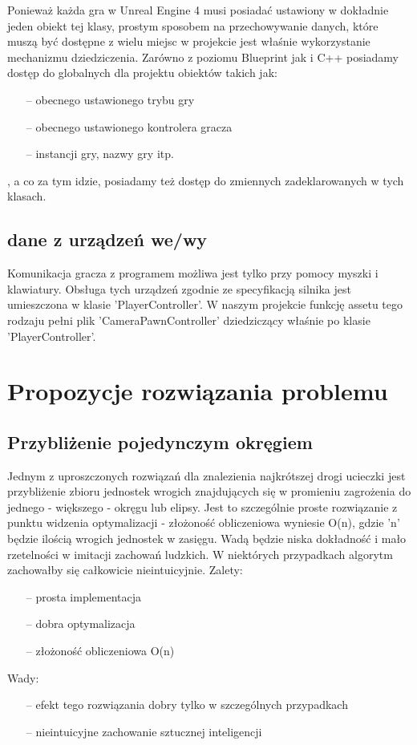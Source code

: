 \documentclass[12pt]{report}
\begin{document}
Ponieważ każda gra w Unreal Engine 4 musi posiadać ustawiony w dokładnie jeden obiekt tej klasy, prostym sposobem na przechowywanie danych, które muszą być dostępne z wielu miejsc w projekcie jest właśnie wykorzystanie mechanizmu dziedziczenia. Zarówno z poziomu Blueprint jak i C++ posiadamy dostęp do globalnych dla projektu obiektów takich jak: 
\begin{itemize}
\item[--] obecnego ustawionego trybu gry
\item[--] obecnego ustawionego kontrolera gracza
\item[--] instancji gry, nazwy gry itp.
\end{itemize}
, a co za tym idzie, posiadamy też dostęp do zmiennych zadeklarowanych w tych klasach.
\subsection{dane z urządzeń we/wy}
Komunikacja gracza z programem możliwa jest tylko przy pomocy myszki i klawiatury. Obsługa tych urządzeń zgodnie ze specyfikacją silnika jest umieszczona w klasie 'PlayerController'. W naszym projekcie funkcję assetu tego rodzaju pełni plik 'CameraPawnController' dziedziczący właśnie po klasie 'PlayerController'.
\section{Propozycje rozwiązania problemu}
\subsection{Przybliżenie pojedynczym okręgiem}
Jednym z uproszczonych rozwiązań dla znalezienia najkrótszej drogi ucieczki jest przybliżenie zbioru jednostek wrogich znajdujących się w promieniu zagrożenia do jednego - większego - okręgu lub elipsy. Jest to szczególnie proste rozwiązanie z punktu widzenia optymalizacji - złożoność obliczeniowa wyniesie O(n), gdzie 'n' będzie ilością wrogich jednostek w zasięgu. Wadą będzie niska dokładność i mało rzetelności w imitacji zachowań ludzkich. W niektórych przypadkach algorytm zachowałby się całkowicie nieintuicyjnie.
Zalety:
\begin{itemize}
\item[--] prosta implementacja
\item[--] dobra optymalizacja
\item[--] złożoność obliczeniowa O(n) 
\end{itemize}
Wady:
\begin{itemize}
\item[--] efekt tego rozwiązania dobry tylko w szczególnych przypadkach
\item[--] nieintuicyjne zachowanie sztucznej inteligencji
\end{itemize}
\end{document}
